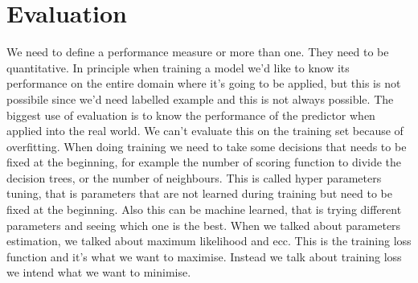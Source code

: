 \chapter{Evaluation}
We need to define a performance measure or more than one. They need to be quantitative.\newline
In principle when training a model we'd like to know its performance on the entire domain where it's going to be applied, but this is not possibile since we'd need labelled example and this is not always possible.\newline
The biggest use of evaluation is to know the performance of the predictor when applied into the real world. We can't evaluate this on the training set because of overfitting.\newline
When doing training we need to take some decisions that needs to be fixed at the beginning, for example the number of scoring function to divide the decision trees, or the number of neighbours. This is called hyper parameters tuning, that is parameters that are not learned during training but need to be fixed at the beginning. Also this can be machine learned, that is trying different parameters and seeing which one is the best.\newline
When we talked about parameters estimation, we talked about maximum likelihood and ecc. This is the training loss function and it's what we want to maximise. Instead we talk about training loss we intend what we want to minimise. 
